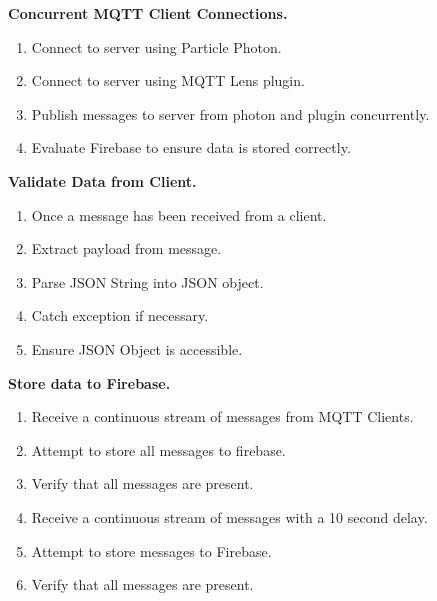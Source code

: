 \documentclass[a4paper,10pt]{article}
\begin{document}
		\textbf{Concurrent MQTT Client Connections.}
		\begin{enumerate}
			\item Connect to server using Particle Photon.
			\item Connect to server using MQTT Lens plugin.
			\item Publish messages to server from photon and plugin concurrently.
			\item Evaluate Firebase to ensure data is stored correctly.
		\end{enumerate}
		\textbf{Validate Data from Client.}
		\begin{enumerate}
			\item Once a message has been received from a client.
			\item Extract payload from message.
			\item Parse JSON String into JSON object.
			\item Catch exception if necessary.
			\item Ensure JSON Object is accessible.
		\end{enumerate}
		\textbf{Store data to Firebase.}
		\begin{enumerate}
			\item Receive a continuous stream of messages from MQTT Clients.
			\item Attempt to store all messages to firebase.
			\item Verify that all messages are present.
			\item Receive a continuous stream of messages with a 10 second delay.
			\item Attempt to store messages to Firebase.
			\item Verify that all messages are present.
		\end{enumerate}
	
\end{document}
